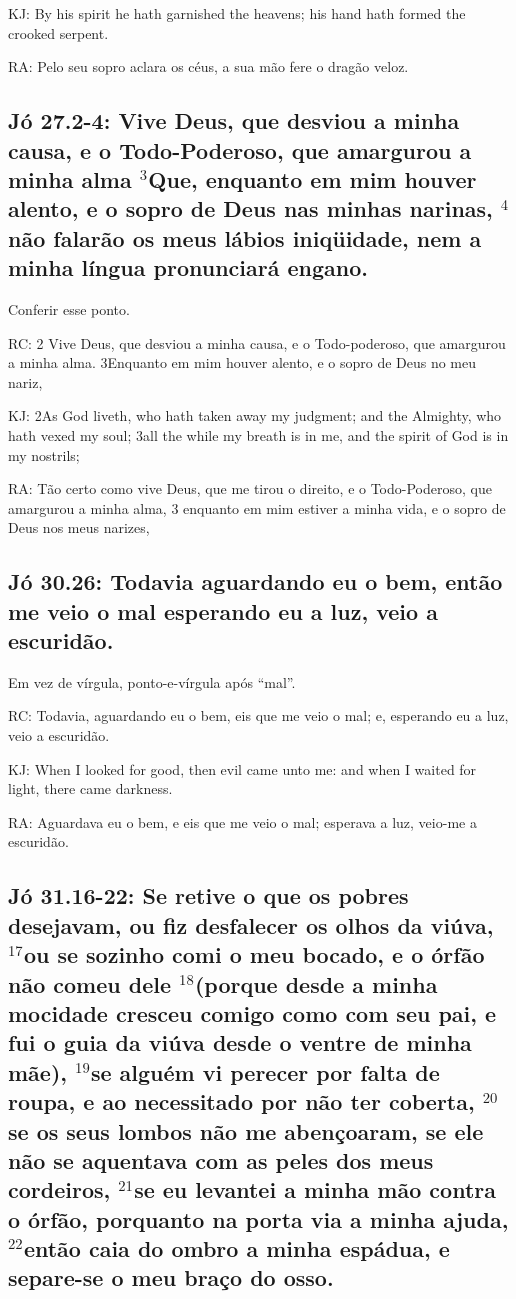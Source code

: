 KJ: By his spirit he hath garnished the heavens; his hand hath formed the crooked serpent.

RA: Pelo seu sopro aclara os céus, a sua mão fere o dragão veloz.

\subsection{Jó 27.2-4: Vive Deus, que desviou a minha causa, e o Todo-Poderoso, que amargurou a minha alma $^{\mathrm{3}}$Que, enquanto em mim houver alento, e o sopro de Deus nas minhas narinas, $^{\mathrm{4}}$não falarão os meus lábios iniqüidade, nem a minha língua pronunciará engano.}
Conferir esse ponto.

RC: 2 Vive Deus, que desviou a minha causa, e o Todo-poderoso, que amargurou a minha alma. 3Enquanto em mim houver alento, e o sopro de Deus no meu nariz,

KJ: 2As God liveth, who hath taken away my judgment; and the Almighty, who hath vexed my soul; 3all the while my breath is in me, and the spirit of God is in my nostrils;

RA: Tão certo como vive Deus, que me tirou o direito, e o Todo-Poderoso, que amargurou a minha alma, 3 enquanto em mim estiver a minha vida, e o sopro de Deus nos meus narizes,

\subsection{Jó 30.26: Todavia aguardando eu o bem, então me veio o mal\uwave{,} esperando eu a luz, veio a escuridão.}
Em vez de vírgula, ponto-e-vírgula após ``mal''.

RC: Todavia, aguardando eu o bem, eis que me veio o mal; e, esperando eu a luz, veio a escuridão.

KJ: When I looked for good, then evil came unto me: and when I waited for light, there came darkness.

RA: Aguardava eu o bem, e eis que me veio o mal; esperava a luz, veio-me a escuridão.

\subsection{Jó 31.16-22: Se retive o que os pobres desejavam, ou fiz desfalecer os olhos da viúva, $^{\mathrm{17}}$ou se\uwave{,} sozinho comi o meu bocado, e o órfão não comeu dele $^{\mathrm{18}}$(porque desde a minha mocidade cresceu comigo como com seu pai, e fui o guia da viúva desde o ventre de minha mãe), $^{\mathrm{19}}$se alguém vi perecer por falta de roupa, e ao necessitado por não ter coberta, $^{\mathrm{20}}$se os seus lombos não me abençoaram, se ele não se aquentava com as peles dos meus cordeiros, $^{\mathrm{21}}$se eu levantei a minha mão contra o órfão, porquanto na porta via a minha ajuda, $^{\mathrm{22}}$então caia do ombro a minha espádua, e separe-se o meu braço do osso.}

